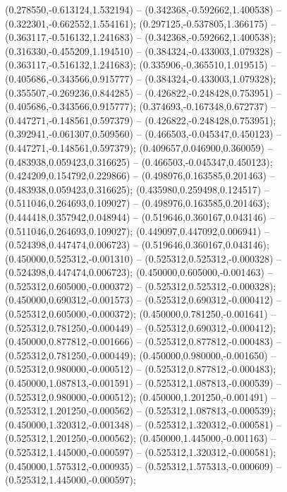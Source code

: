  (0.278550,-0.613124,1.532194) -- (0.342368,-0.592662,1.400538) -- (0.322301,-0.662552,1.554161);
 (0.297125,-0.537805,1.366175) -- (0.363117,-0.516132,1.241683) -- (0.342368,-0.592662,1.400538);
 (0.316330,-0.455209,1.194510) -- (0.384324,-0.433003,1.079328) -- (0.363117,-0.516132,1.241683);
 (0.335906,-0.365510,1.019515) -- (0.405686,-0.343566,0.915777) -- (0.384324,-0.433003,1.079328);
 (0.355507,-0.269236,0.844285) -- (0.426822,-0.248428,0.753951) -- (0.405686,-0.343566,0.915777);
 (0.374693,-0.167348,0.672737) -- (0.447271,-0.148561,0.597379) -- (0.426822,-0.248428,0.753951);
 (0.392941,-0.061307,0.509560) -- (0.466503,-0.045347,0.450123) -- (0.447271,-0.148561,0.597379);
 (0.409657,0.046900,0.360059) -- (0.483938,0.059423,0.316625) -- (0.466503,-0.045347,0.450123);
 (0.424209,0.154792,0.229866) -- (0.498976,0.163585,0.201463) -- (0.483938,0.059423,0.316625);
 (0.435980,0.259498,0.124517) -- (0.511046,0.264693,0.109027) -- (0.498976,0.163585,0.201463);
 (0.444418,0.357942,0.048944) -- (0.519646,0.360167,0.043146) -- (0.511046,0.264693,0.109027);
 (0.449097,0.447092,0.006941) -- (0.524398,0.447474,0.006723) -- (0.519646,0.360167,0.043146);
 (0.450000,0.525312,-0.001310) -- (0.525312,0.525312,-0.000328) -- (0.524398,0.447474,0.006723);
 (0.450000,0.605000,-0.001463) -- (0.525312,0.605000,-0.000372) -- (0.525312,0.525312,-0.000328);
 (0.450000,0.690312,-0.001573) -- (0.525312,0.690312,-0.000412) -- (0.525312,0.605000,-0.000372);
 (0.450000,0.781250,-0.001641) -- (0.525312,0.781250,-0.000449) -- (0.525312,0.690312,-0.000412);
 (0.450000,0.877812,-0.001666) -- (0.525312,0.877812,-0.000483) -- (0.525312,0.781250,-0.000449);
 (0.450000,0.980000,-0.001650) -- (0.525312,0.980000,-0.000512) -- (0.525312,0.877812,-0.000483);
 (0.450000,1.087813,-0.001591) -- (0.525312,1.087813,-0.000539) -- (0.525312,0.980000,-0.000512);
 (0.450000,1.201250,-0.001491) -- (0.525312,1.201250,-0.000562) -- (0.525312,1.087813,-0.000539);
 (0.450000,1.320312,-0.001348) -- (0.525312,1.320312,-0.000581) -- (0.525312,1.201250,-0.000562);
 (0.450000,1.445000,-0.001163) -- (0.525312,1.445000,-0.000597) -- (0.525312,1.320312,-0.000581);
 (0.450000,1.575312,-0.000935) -- (0.525312,1.575313,-0.000609) -- (0.525312,1.445000,-0.000597);
